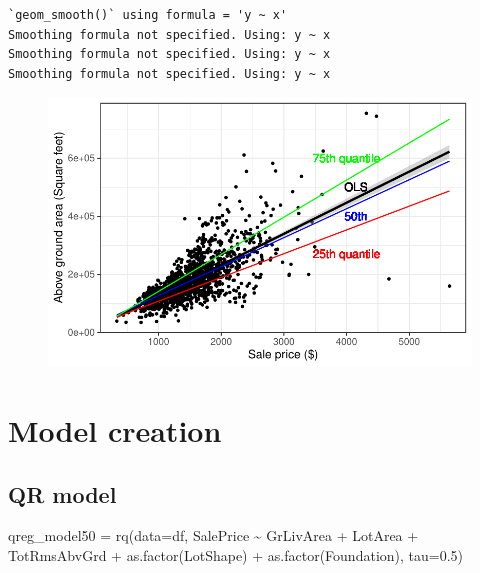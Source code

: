 \documentclass[
  letterpaper,
  DIV=11,
  numbers=noendperiod]{scrreprt}
\newenvironment{Shaded}{\begin{snugshade}}{\end{snugshade}}
\newcommand{\AttributeTok}[1]{\textcolor[rgb]{0.40,0.45,0.13}{#1}}
\newcommand{\FloatTok}[1]{\textcolor[rgb]{0.68,0.00,0.00}{#1}}
\newcommand{\FunctionTok}[1]{\textcolor[rgb]{0.28,0.35,0.67}{#1}}
\newcommand{\NormalTok}[1]{\textcolor[rgb]{0.00,0.23,0.31}{#1}}
\newcommand{\OtherTok}[1]{\textcolor[rgb]{0.00,0.23,0.31}{#1}}
\newcommand{\SpecialCharTok}[1]{\textcolor[rgb]{0.37,0.37,0.37}{#1}}
\begin{document}
\begin{verbatim}
`geom_smooth()` using formula = 'y ~ x'
Smoothing formula not specified. Using: y ~ x
Smoothing formula not specified. Using: y ~ x
Smoothing formula not specified. Using: y ~ x
\end{verbatim}

\begin{figure}[H]

{\centering \includegraphics{analysis_files/figure-pdf/Visualizing housing-2.pdf}

}

\end{figure}

\hypertarget{model-creation}{%
\section{Model creation}\label{model-creation}}

\hypertarget{qr-model}{%
\subsection{QR model}\label{qr-model}}

\begin{Shaded}
\begin{Highlighting}[]
\NormalTok{qreg\_model50 }\OtherTok{=} \FunctionTok{rq}\NormalTok{(}\AttributeTok{data=}\NormalTok{df, SalePrice }\SpecialCharTok{\textasciitilde{}}\NormalTok{ GrLivArea }\SpecialCharTok{+}\NormalTok{ LotArea }\SpecialCharTok{+}\NormalTok{ TotRmsAbvGrd }\SpecialCharTok{+} \FunctionTok{as.factor}\NormalTok{(LotShape) }\SpecialCharTok{+} \FunctionTok{as.factor}\NormalTok{(Foundation), }\AttributeTok{tau=}\FloatTok{0.5}\NormalTok{)}
\end{Highlighting}
\end{Shaded}
\end{document}
